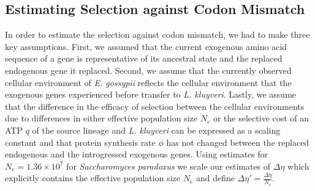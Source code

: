 \documentclass{bmcart}
\newcommand{\kluyveri}{\textit{L. kluyveri}\xspace}
\newcommand{\gossypii}{\textit{E. gossypii}\xspace}
\newcommand{\DE}{\ensuremath{{\Delta \eta}}\xspace}
\newcommand{\Ne}{\ensuremath{N_e}\xspace}
\begin{document}
\subsection*{Estimating Selection against Codon Mismatch}

In order to estimate the selection against codon mismatch, we had to make three key assumptions.
First, we assumed that the current exogenous amino acid sequence of a gene is representative of its ancestral state and the replaced endogenous gene it replaced.
Second, we assume that the currently observed cellular environment of \gossypii reflects the cellular environment that the exogenous genes experienced before transfer to \kluyveri.
Lastly, we assume that the difference in the efficacy of selection between the cellular environments due to differences in either effective population size $\Ne$ or the selective cost of an ATP $q$ of the source lineage and \kluyveri can be expressed as a scaling constant and that protein synthesis rate $\phi$ has not changed between the replaced endogenous and the introgressed exogenous genes.
Using estimates for $\Ne = 1.36\times10^7$ \citep{wagner2005} for \textit{Saccharomyces paradoxus} we scale our estimates of \DE which explicitly contains the effective population size $\Ne$ \citep{gilchrist2015} and define $\DE' = \frac{\DE}{\Ne}$.
\end{document}
